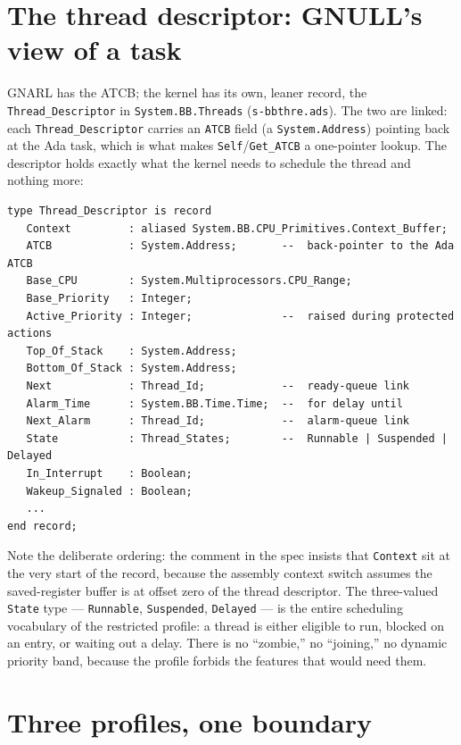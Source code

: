 \section{The thread descriptor: GNULL's view of a task}

GNARL has the ATCB; the kernel has its own, leaner record, the
\texttt{Thread\_Descriptor} in \texttt{System.BB.Threads} (\texttt{s-bbthre.ads}).
The two are linked: each \texttt{Thread\_Descriptor} carries an \texttt{ATCB}
field (a \texttt{System.Address}) pointing back at the Ada task, which is what
makes \texttt{Self}/\texttt{Get\_ATCB} a one-pointer lookup. The descriptor holds
exactly what the kernel needs to schedule the thread and nothing more:

\begin{lstlisting}
type Thread_Descriptor is record
   Context         : aliased System.BB.CPU_Primitives.Context_Buffer;
   ATCB            : System.Address;       --  back-pointer to the Ada ATCB
   Base_CPU        : System.Multiprocessors.CPU_Range;
   Base_Priority   : Integer;
   Active_Priority : Integer;              --  raised during protected actions
   Top_Of_Stack    : System.Address;
   Bottom_Of_Stack : System.Address;
   Next            : Thread_Id;            --  ready-queue link
   Alarm_Time      : System.BB.Time.Time;  --  for delay until
   Next_Alarm      : Thread_Id;            --  alarm-queue link
   State           : Thread_States;        --  Runnable | Suspended | Delayed
   In_Interrupt    : Boolean;
   Wakeup_Signaled : Boolean;
   ...
end record;
\end{lstlisting}

Note the deliberate ordering: the comment in the spec insists that
\texttt{Context} sit at the very start of the record, because the assembly
context switch assumes the saved-register buffer is at offset zero of the thread
descriptor. The three-valued \texttt{State} type --- \texttt{Runnable},
\texttt{Suspended}, \texttt{Delayed} --- is the entire scheduling vocabulary of
the restricted profile: a thread is either eligible to run, blocked on an entry,
or waiting out a delay. There is no ``zombie,'' no ``joining,'' no dynamic
priority band, because the profile forbids the features that would need them.

\section{Three profiles, one boundary}

